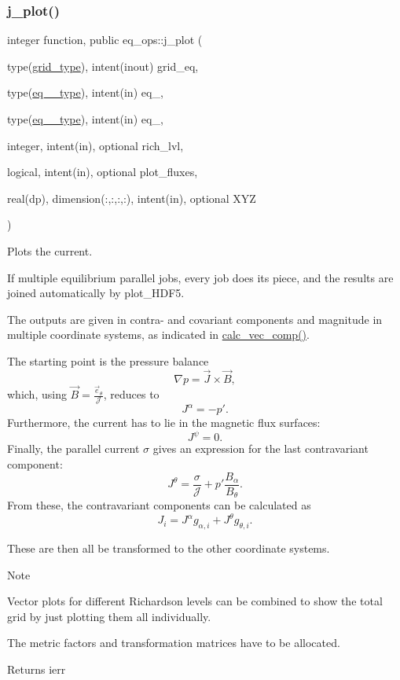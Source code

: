 \subsubsection{\texorpdfstring{j\+\_\+plot()}{j\_plot()}}
{\footnotesize\ttfamily integer function, public eq\+\_\+ops\+::j\+\_\+plot (\begin{DoxyParamCaption}\item[{type(\hyperlink{structgrid__vars_1_1grid__type}{grid\+\_\+type}), intent(inout)}]{grid\+\_\+eq,  }\item[{type(\hyperlink{structeq__vars_1_1eq__1__type}{eq\+\_\+1\+\_\+type}), intent(in)}]{eq\+\_,  }\item[{type(\hyperlink{structeq__vars_1_1eq__2__type}{eq\+\_\+2\+\_\+type}), intent(in)}]{eq\+\_,  }\item[{integer, intent(in), optional}]{rich\+\_\+lvl,  }\item[{logical, intent(in), optional}]{plot\+\_\+fluxes,  }\item[{real(dp), dimension(\+:,\+:,\+:,\+:), intent(in), optional}]{X\+YZ }\end{DoxyParamCaption})}



Plots the current. 

If multiple equilibrium parallel jobs, every job does its piece, and the results are joined automatically by plot\+\_\+\+H\+D\+F5.

The outputs are given in contra-\/ and covariant components and magnitude in multiple coordinate systems, as indicated in \hyperlink{namespacegrid__utilities_ad3d9386b9abcb1a7e17369a1b3a3750d}{calc\+\_\+vec\+\_\+comp()}.

The starting point is the pressure balance \[ \nabla p = \vec{J} \times \vec{B}, \] which, using $\vec{B} = \frac{\vec{e}_{\theta}}{\mathcal{J}}$, reduces to \[J^\alpha = -p'. \] Furthermore, the current has to lie in the magnetic flux surfaces\+: \[J^\psi = 0. \] Finally, the parallel current $\sigma$ gives an expression for the last contravariant component\+: \[J^\theta = \frac{\sigma}{\mathcal{J}} + p' \frac{B_\alpha}{B_\theta}. \] From these, the contravariant components can be calculated as \[J_i = J^\alpha g_{\alpha,i} + J^\theta g_{\theta,i}. \]

These are then all be transformed to the other coordinate systems. \begin{DoxyNote}{Note}

\begin{DoxyEnumerate}
\item Vector plots for different Richardson levels can be combined to show the total grid by just plotting them all individually.
\item The metric factors and transformation matrices have to be allocated.
\end{DoxyEnumerate}
\end{DoxyNote}
\begin{DoxyReturn}{Returns}
ierr
\end{DoxyReturn}

